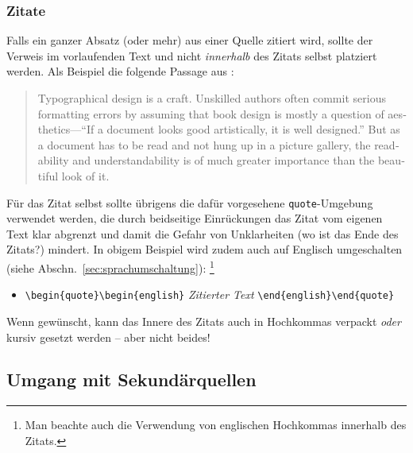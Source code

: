 \subsubsection{Zitate}
Falls ein ganzer Absatz (oder mehr) aus einer Quelle zitiert wird,
sollte der Verweis im vorlaufenden Text und nicht
\emph{innerhalb} des Zitats selbst platziert werden. Als Beispiel die folgende Passage
aus \cite{Oetiker2015}:
%
\begin{quote}\begin{english}
Typographical design is a craft. Unskilled authors often commit
serious formatting errors by assuming that book design is mostly a
question of aesthetics---``If a document looks good artistically,
it is well designed.'' But as a document has to be read and not
hung up in a picture gallery, the readability and
understandability is of much greater importance than the beautiful
look of it.
\end{english}\end{quote}
%
Für das Zitat selbst sollte übrigens die dafür vorgesehene \texttt{quote}-Umgebung
verwendet werden, die durch beidseitige Einrückungen das
Zitat vom eigenen Text klar abgrenzt und damit die Gefahr von
Unklarheiten (wo ist das Ende des Zitats?) mindert.
In obigem Beispiel wird zudem auch auf Englisch umgeschalten
(siehe Abschn.\ \ref{sec:sprachumschaltung}):%
\footnote{Man beachte auch die Verwendung von englischen Hochkommas innerhalb des Zitats.}
%
\begin{itemize}
 \item[] \verb!\begin{quote}\begin{english}! \emph{Zitierter Text} \verb!\end{english}\end{quote}!
\end{itemize}
%
Wenn gewünscht, kann das Innere des Zitats auch in Hochkommas verpackt 
\emph{oder} kursiv gesetzt werden -- aber nicht beides!



\subsection{Umgang mit Sekundärquellen}

